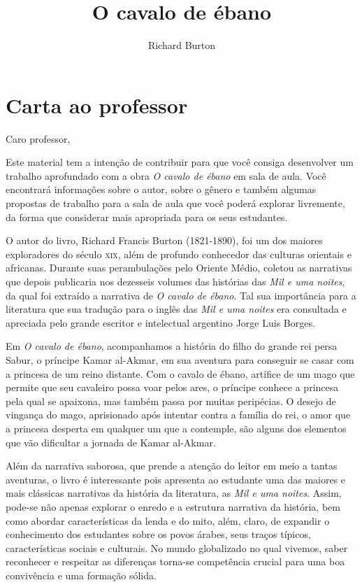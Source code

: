\documentclass[11pt]{extarticle}
\newcommand{\AutorLivro}{Richard Burton}
\newcommand{\TituloLivro}{O cavalo de ébano}
\newcommand{\colaborador}{Paulo Pompermaier}
\begin{document}
\title{\TituloLivro}
\author{\AutorLivro}
\def\authornotes{\colaborador}

\date{}
\maketitle

\tableofcontents

\section{Carta ao professor}

Caro professor,

Este material tem a intenção de contribuir para que você consiga desenvolver um trabalho aprofundado com a obra \textit{O cavalo de ébano} em sala de aula.
Você encontrará informações sobre o autor, sobre o gênero e também 
algumas propostas de trabalho para a sala de aula que você poderá explorar livremente, 
da forma que considerar mais apropriada para os seus estudantes.

O autor do livro, Richard Francis Burton (1821-1890), foi um dos maiores
exploradores do século \textsc{xix}, além de profundo conhecedor das culturas orientais e africanas. Durante suas perambulações pelo Oriente Médio, coletou as narrativas que depois publicaria nos dezesseis volumes das histórias das \textit{Mil e uma noites}, da qual foi extraído a narrativa de \textit{O cavalo de ébano}. Tal sua importância para a literatura que sua tradução para o inglês das \textit{Mil e uma noites} era consultada e apreciada pelo grande escritor e intelectual argentino Jorge Luis Borges.

Em \textit{O cavalo de ébano}, acompanhamos a história do filho do grande rei persa Sabur, o príncipe Kamar al-Akmar, em sua aventura para conseguir se casar com a princesa de um reino distante. Com o cavalo de ébano, artífice de um mago que permite que seu cavaleiro possa voar pelos ares, o príncipe conhece a princesa pela qual se apaixona, mas também passa por muitas peripécias. O desejo de vingança do mago, aprisionado após intentar contra a família do rei, o amor que a princesa desperta em qualquer um que a contemple, são alguns dos elementos que vão dificultar a jornada de Kamar al-Akmar.

Além da narrativa saborosa, que prende a atenção do leitor em meio a tantas aventuras, o livro é interessante pois apresenta ao estudante uma das maiores e mais clássicas narrativas da história da literatura, as \textit{Mil e uma noites}. Assim, pode-se não apenas explorar o enredo e a estrutura narrativa da história, bem como abordar características da lenda e do mito, além, claro, de expandir o conhecimento dos estudantes sobre os povos árabes, seus traços típicos, características sociais e culturais. No mundo globalizado no qual vivemos, saber reconhecer e respeitar as diferenças torna-se competência crucial para uma boa convivência e uma formação sólida.
\end{document}
